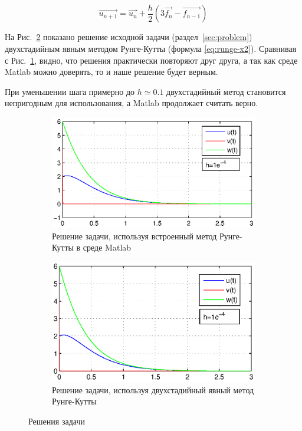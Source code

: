 \documentclass[12pt,a4paper]{article}
\begin{document}
\begin{equation} \label{eq:runge-x2}
	\overrightarrow{u_{n+1}} = \overrightarrow{u_n} + \frac{h}{2} \left( 3 \overrightarrow{f_n} - \overrightarrow{f_{n-1}} \right)
\end{equation}

На Рис.~\ref{fig:fig2} показано решение исходной задачи (раздел~\ref{sec:problem}) двухстадийным явным методом Рунге-Кутты (формула \ref{eq:runge-x2}). Сравнивая с Рис.~\ref{fig:fig1}, видно, что решения практически повторяют друг друга, а так как среде Matlab можно доверять, то и наше решение будет верным. \par
При уменьшении шага примерно до $h \simeq 0.1 $ двухстадийный метод становится непригодным для использования, а Matlab продолжает считать верно. \par

\begin{figure}
    \centering
    \begin{subfigure}[b]{\textwidth}
        \includegraphics{runge-matlab.eps}
        \caption{Решение задачи, используя встроенный метод Рунге-Кутты в среде Matlab}
        \label{fig:fig1}
    \end{subfigure}
    \begin{subfigure}[b]{\textwidth}
        \includegraphics{runge-2x.eps}
        \caption{Решение задачи, используя двухстадийный явный метод Рунге-Кутты}
        \label{fig:fig2}
    \end{subfigure}
    \caption{Решения задачи}\label{fig:graph}
\end{figure}
\end{document}
